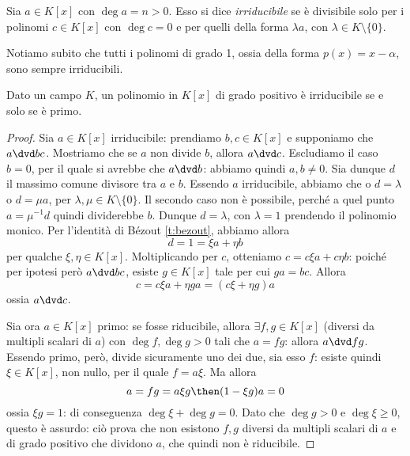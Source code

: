 \begin{definizione} \label{d:polinomio-irriducibile}
	Sia $a\in K[x]$ con $\deg a=n>0$.
	Esso si dice \emph{irriducibile} se è divisibile solo per i polinomi $c\in K[x]$ con $\deg c=0$ e per quelli della forma $\lambda a$, con $\lambda\in K\setminus\{0\}$.
\end{definizione}
Notiamo subito che tutti i polinomi di grado 1, ossia della forma $p(x)=x-\alpha$, sono sempre irriducibili.

\begin{teorema} \label{t:polinomio-irriducibile-primo}
	Dato un campo $K$, un polinomio in $K[x]$ di grado positivo è irriducibile se e solo se è primo.
\end{teorema}
\begin{proof}
	Sia $a\in K[x]$ irriducibile: prendiamo $b,c\in K[x]$ e supponiamo che $a\dvd bc$.
	Mostriamo che se $a$ non divide $b$, allora $a\dvd c$.
	Escludiamo il caso $b=0$, per il quale si avrebbe che $a\dvd b$: abbiamo quindi $a,b\ne 0$.
	Sia dunque $d$ il massimo comune divisore tra $a$ e $b$.
	Essendo $a$ irriducibile, abbiamo che o $d=\lambda$ o $d=\mu a$, per $\lambda,\mu\in K\setminus\{0\}$.
	Il secondo caso non è possibile, perch\'e a quel punto $a=\mu^{-1}d$ quindi dividerebbe $b$.
	Dunque $d=\lambda$, con $\lambda=1$ prendendo il polinomio monico.
	Per l'identità di B\'ezout \ref{t:bezout}, abbiamo allora
	\begin{equation*}
		d=1=\xi a+\eta b
	\end{equation*}
	per qualche $\xi,\eta\in K[x]$.
	Moltiplicando per $c$, otteniamo $c=c\xi a+c\eta b$: poich\'e per ipotesi però $a\dvd bc$, esiste $g\in K[x]$ tale per cui $ga=bc$.
	Allora
	\begin{equation*}
		c=c\xi a+\eta ga=(c\xi+\eta g)a
	\end{equation*}
	ossia $a\dvd c$.

	Sia ora $a\in K[x]$ primo: se fosse riducibile, allora $\exists f,g\in K[x]$ (diversi da multipli scalari di $a$) con $\deg f,\deg g>0$ tali che $a=fg$: allora $a\dvd fg$.
	Essendo primo, però, divide sicuramente uno dei due, sia esso $f$: esiste quindi $\xi\in K[x]$, non nullo, per il quale $f=a\xi$.
	Ma allora
	\begin{equation*}
		a=fg=a\xi g \then (1-\xi g)a=0
	\end{equation*}
	ossia $\xi g=1$: di conseguenza $\deg\xi+\deg g=0$.
	Dato che $\deg g>0$ e $\deg\xi\ge 0$, questo è assurdo: ciò prova che non esistono $f,g$ diversi da multipli scalari di $a$ e di grado positivo che dividono $a$, che quindi non è riducibile.
\end{proof}

